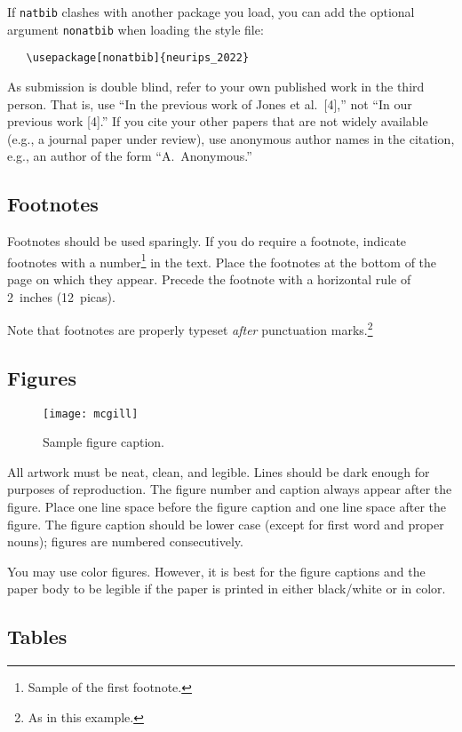 \documentclass{article}
\begin{document}
If \verb+natbib+ clashes with another package you load, you can add the optional
argument \verb+nonatbib+ when loading the style file:
\begin{verbatim}
   \usepackage[nonatbib]{neurips_2022}
\end{verbatim}


As submission is double blind, refer to your own published work in the third
person. That is, use ``In the previous work of Jones et al.\ [4],'' not ``In our
previous work [4].'' If you cite your other papers that are not widely available
(e.g., a journal paper under review), use anonymous author names in the
citation, e.g., an author of the form ``A.\ Anonymous.''


\subsection{Footnotes}


Footnotes should be used sparingly.  If you do require a footnote, indicate
footnotes with a number\footnote{Sample of the first footnote.} in the
text. Place the footnotes at the bottom of the page on which they appear.
Precede the footnote with a horizontal rule of 2~inches (12~picas).


Note that footnotes are properly typeset \emph{after} punctuation
marks.\footnote{As in this example.}


\subsection{Figures}


\begin{figure}
  \centering
  \texttt{[image: mcgill]}
  \caption{Sample figure caption.}
\end{figure}


All artwork must be neat, clean, and legible. Lines should be dark enough for
purposes of reproduction. The figure number and caption always appear after the
figure. Place one line space before the figure caption and one line space after
the figure. The figure caption should be lower case (except for first word and
proper nouns); figures are numbered consecutively.


You may use color figures.  However, it is best for the figure captions and the
paper body to be legible if the paper is printed in either black/white or in
color.


\subsection{Tables}
\end{document}
